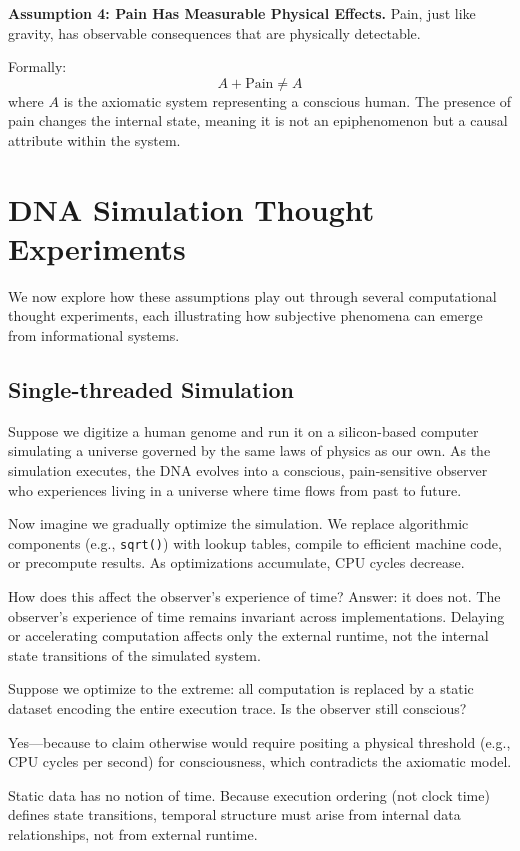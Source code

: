 \documentclass[11pt]{article}
\begin{document}
\textbf{Assumption 4: Pain Has Measurable Physical Effects.}
Pain, just like gravity, has observable consequences that are physically detectable.

Formally:
\[
  A + \text{Pain} \neq A
\]
where \( A \) is the axiomatic system representing a conscious human. The presence of pain changes the internal state, meaning it is not an epiphenomenon but a causal attribute within the system.


\section{DNA Simulation Thought Experiments}

We now explore how these assumptions play out through several computational thought experiments, each illustrating how subjective phenomena can emerge from informational systems.

\subsection{Single-threaded Simulation}

Suppose we digitize a human genome and run it on a silicon-based computer simulating a universe governed by the same laws 
of physics as our own. As the simulation executes, the DNA evolves into a conscious, pain-sensitive observer who experiences 
living in a universe where time flows from past to future.

Now imagine we gradually optimize the simulation. We replace algorithmic components (e.g., \texttt{sqrt()}) with lookup tables, 
compile to efficient machine code, or precompute results. As optimizations accumulate, CPU cycles decrease.

How does this affect the observer's experience of time? Answer: it does not. The observer’s experience of time remains invariant 
across implementations. Delaying or accelerating computation affects only the external runtime, not the internal state transitions 
of the simulated system.

Suppose we optimize to the extreme: all computation is replaced by a static dataset encoding the entire execution trace. 
Is the observer still conscious?

Yes—because to claim otherwise would require positing a physical threshold (e.g., CPU cycles per second) for consciousness, 
which contradicts the axiomatic model.

Static data has no notion of time. Because execution ordering (not clock time) defines state transitions, temporal structure 
must arise from internal data relationships, not from external runtime.
\end{document}
